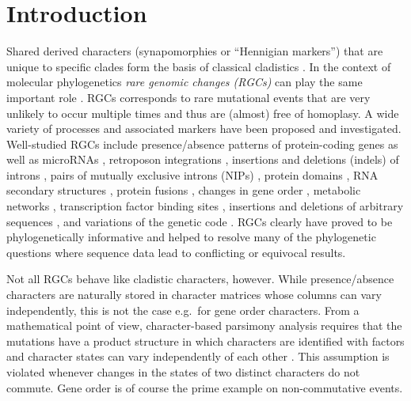 \documentclass[smallextended]{svjour3}
\let\cite\citep
\begin{document}
\sloppy

\section{Introduction}

Shared derived characters (synapomorphies or ``Hennigian markers'') that
are unique to specific clades form the basis of classical cladistics
\cite{Hennig:50}. In the context of molecular phylogenetics \emph{rare
  genomic changes (RGCs)} can play the same important role
\cite{Rokas:00,Boore:06}. RGCs corresponds to rare mutational events that
are very unlikely to occur multiple times and thus are (almost) free of
homoplasy. A wide variety of processes and associated markers have been
proposed and investigated. Well-studied RGCs include presence/absence
patterns of protein-coding genes \cite{Dutilh:08} as well as microRNAs
\cite{Sempere:06}, retroposon integrations \cite{Shedlock:00}, insertions
and deletions (indels) of introns \cite{Rogozin:05}, pairs of mutually
exclusive introns (NIPs) \cite{Krauss:08a}, protein domains
\cite{Deeds:05,Yang:05}, RNA secondary structures \cite{Misof:03}, protein
fusions \cite{Stechmann:03}, changes in gene order
\cite{Sankoff:82,Boore:98,Lavrov:07}, metabolic networks
\cite{Forst:01,Forst:06a,Mazurie:08}, transcription factor binding sites
\cite{Prohaska:04a}, insertions and deletions of arbitrary sequences
\cite{Simmons:00,Ashkenazy:14,Donath:14a}, and variations of the genetic
code \cite{Abascal:12}. RGCs clearly have proved to be phylogenetically
informative and helped to resolve many of the phylogenetic questions where
sequence data lead to conflicting or equivocal results.

Not all RGCs behave like cladistic characters, however. While
presence/absence characters are naturally stored in character matrices
whose columns can vary independently, this is not the case e.g.\ for gene
order characters. From a mathematical point of view, character-based
parsimony analysis requires that the mutations have a product structure in
which characters are identified with factors and character states can vary
independently of each other \cite{Wagner:03a}. This assumption is violated
whenever changes in the states of two distinct characters do not commute.
Gene order is of course the prime example on non-commutative events.
  
\end{document}
